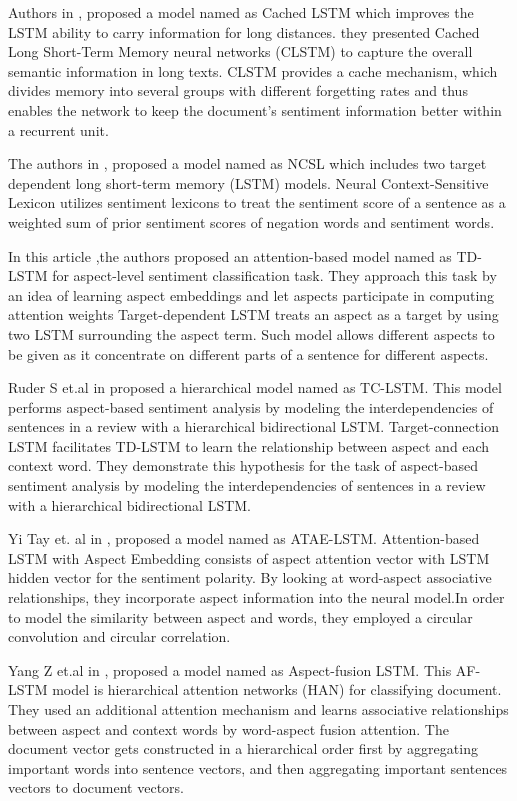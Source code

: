 \documentclass[journal]{IEEEtran}
\begin{document}
Authors in \cite{XuJ}, proposed a model named as Cached LSTM which improves the LSTM ability to carry information for long distances. they presented Cached Long Short-Term Memory neural networks (CLSTM) to capture the overall semantic information in long texts. CLSTM provides a cache mechanism, which divides memory into several groups with different forgetting rates and thus enables the network to keep the document's sentiment information better within a recurrent unit. 
\mdskip

The authors in \cite{Tang} , proposed a model named as NCSL which includes two target dependent long short-term memory (LSTM) models. Neural Context-Sensitive Lexicon utilizes sentiment lexicons to treat the sentiment score of a sentence as a weighted sum of prior sentiment scores of negation words and sentiment words.  
\mdskip

In this article \cite{Wang} ,the authors proposed an attention-based model named as TD-LSTM for aspect-level sentiment classification task. They approach this task by an idea of learning aspect embeddings and let aspects participate in computing attention weights
Target-dependent LSTM treats an aspect as a target by using two LSTM surrounding the aspect term. Such model allows different aspects to be given as it concentrate on different parts of a sentence for different aspects.
\mdskip

Ruder S et.al in \cite{Ruder} proposed a hierarchical model named as TC-LSTM. This model performs aspect-based sentiment analysis by modeling the interdependencies of sentences in a review with a hierarchical bidirectional LSTM.  Target-connection LSTM  facilitates TD-LSTM to learn the relationship between aspect and each context word. They demonstrate this hypothesis for the task of aspect-based sentiment analysis by modeling the interdependencies of sentences in a review with a hierarchical bidirectional LSTM.
\mdskip

Yi Tay et. al in \cite{Tay} , proposed a model named as ATAE-LSTM. Attention-based LSTM with Aspect Embedding consists of aspect attention vector with LSTM hidden vector for the sentiment polarity. By looking at word-aspect associative relationships, they incorporate aspect information into the neural model.In order to model the similarity between aspect and words, they employed a circular convolution and circular correlation. 
\mdskip

Yang Z et.al in \cite{Yang}, proposed a model named as Aspect-fusion LSTM. This AF-LSTM model is hierarchical attention networks (HAN) for classifying document.  They used an additional attention mechanism and learns associative relationships between aspect and context words by word-aspect fusion attention. The document vector gets constructed in a hierarchical order first by aggregating important words into sentence vectors, and then aggregating important sentences vectors to document vectors. 
\end{document}
